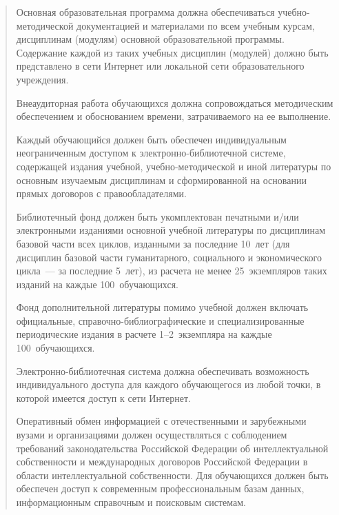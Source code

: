 \documentclass{rpd}
\begin{document}
    \begin{quotation}
    Основная образовательная программа должна обеспечиваться учебно-методической документацией и материалами по всем учебным курсам, дисциплинам (модулям) основной образовательной программы. Содержание каждой из таких учебных дисциплин (модулей) должно быть представлено в сети Интернет или локальной сети образовательного учреждения. 

    Внеаудиторная работа обучающихся должна сопровождаться методическим обеспечением и обоснованием времени, затрачиваемого на ее выполнение. 

    Каждый обучающийся должен быть обеспечен индивидуальным неограниченным доступом к электронно-библиотечной системе, содержащей издания учебной, учебно-методической и иной литературы по основным изучаемым дисциплинам и сформированной на основании прямых договоров с правообладателями.

    Библиотечный фонд должен быть укомплектован печатными и/или электронными изданиями основной учебной литературы по дисциплинам базовой части всех циклов, изданными за последние 10~лет (для дисциплин базовой части гуманитарного, социального и экономического цикла~--- за последние 5~лет), из расчета не менее 25~экземпляров таких изданий на каждые 100~обучающихся.

    Фонд дополнительной литературы помимо учебной должен включать официальные, справочно-библиографические и специализированные периодические издания в расчете 1--2~экземпляра на каждые 100~обучающихся.

    Электронно-библиотечная система должна обеспечивать возможность индивидуального доступа для каждого обучающегося из любой точки, в которой имеется доступ к сети Интернет.

    Оперативный обмен информацией с отечественными и зарубежными вузами и организациями должен осуществляться с соблюдением требований законодательства Российской Федерации об интеллектуальной собственности и международных договоров Российской Федерации в области интеллектуальной собственности. Для обучающихся должен быть обеспечен доступ к современным профессиональным базам данных, информационным справочным и     поисковым системам.
    \end{quotation}
\end{document}
